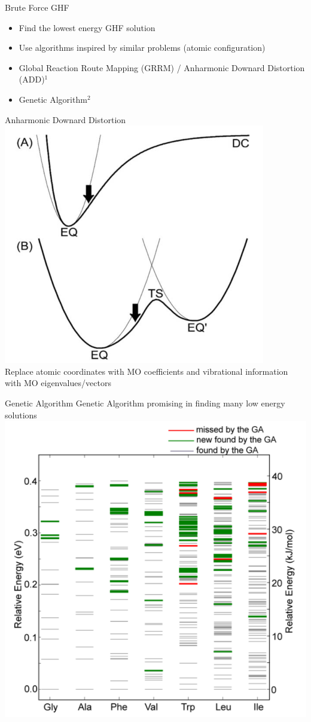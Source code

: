 \documentclass[10pt]{beamer}
\begin{document}
{{{{{{{{{{{{
\begin{frame}{Brute Force GHF}
	\begin{itemize}[<+->]
  	\item Find the lowest energy GHF solution 
  	\item Use algorithms inspired by similar problems (atomic configuration)
  	\item Global Reaction Route Mapping (GRRM) / Anharmonic Downard Distortion (ADD)$^1$
  	\item Genetic Algorithm$^2$
	\end{itemize}
\end{frame}

\begin{frame}{Anharmonic Downard Distortion}
  \centering
	\includegraphics[width=.6\linewidth]{../figures/ADD.png}\\
	Replace atomic coordinates with MO coefficients and vibrational information with MO 
	eigenvalues/vectors
\end{frame}

\begin{frame}{Genetic Algorithm}
  \centering
  Genetic Algorithm promising in finding many low energy solutions
	\includegraphics[width=.6\linewidth]{../figures/GA_supady.png}
\end{frame}

}}}}}}}}}}}}
\end{document}
